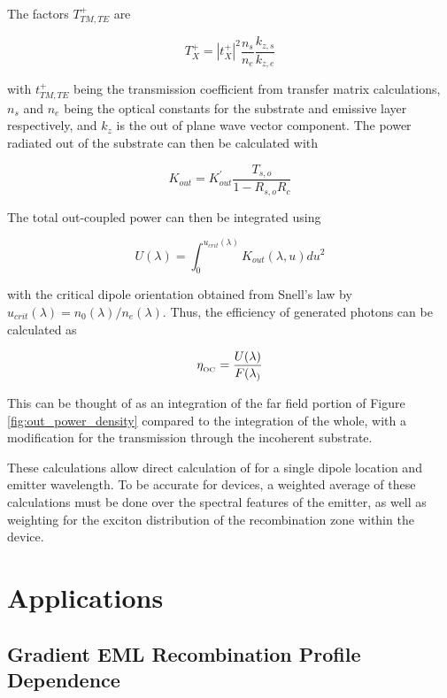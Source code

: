 \documentclass[../thesis.tex]{subfiles}
\begin{document}
The factors $T_{TM,TE}^+$ are

\begin{equation}
T_X^+ = |t_{X}^+|^2\frac{n_s}{n_e}\frac{k_{z,s}}{k_{z,e}}
\end{equation}

with $t_{TM,TE}^+$ being the transmission coefficient from transfer matrix calculations, $n_s$ and $n_e$ being the optical constants for the substrate and emissive layer respectively, and $k_z$ is the out of plane wave vector component.
The power radiated out of the substrate can then be calculated with

\begin{equation}
K_{out}=K_{out}^\prime\frac{T_{s,o}}{1-R_{s,o}R_c}
\end{equation}

The total out-coupled power can then be integrated using

\begin{equation}
U(\lambda)=\int_0^{u_{crit}(\lambda)} K_{out}(\lambda,u)du^2
\end{equation}

with the critical dipole orientation obtained from Snell's law by $u_{crit}(\lambda)=n_0(\lambda)/n_e(\lambda)$.
Thus, the efficiency of generated photons can be calculated as

\begin{equation}
\eta_{_\text{\tiny OC}}=\frac{U(\lambda)}{F(\lambda_)}
\end{equation}

This can be thought of as an integration of the far field portion of Figure \ref{fig:out_power_density} compared to the integration of the whole, with a modification for the transmission through the incoherent substrate.

These calculations allow direct calculation of \oc for a single dipole location and emitter wavelength.
To be accurate for devices, a weighted average of these calculations must be done over the spectral features of the emitter, as well as weighting for the exciton distribution of the recombination zone within the device.



\section{Applications}

\subsection{Gradient EML Recombination Profile Dependence}
\end{document}
